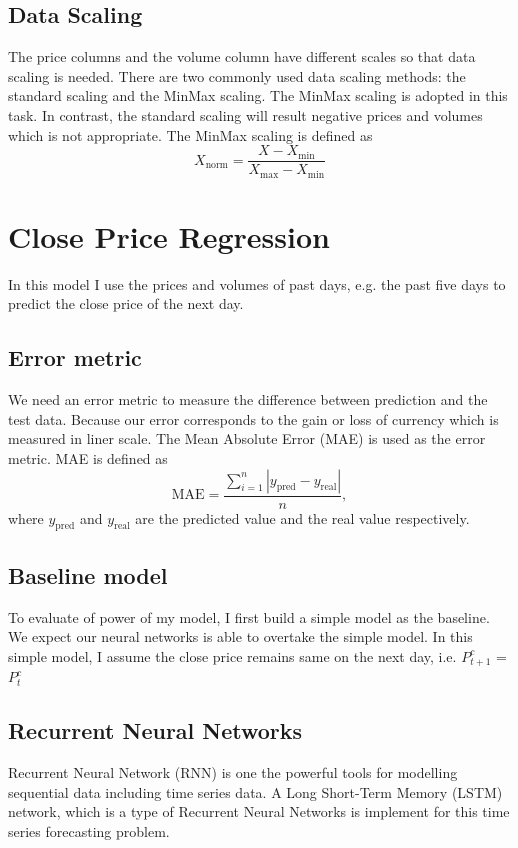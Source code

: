 \documentclass[a4paper, 11pt, usenatbib]{article}
\begin{document}
\subsection{Data Scaling}
The price columns and the volume column have different scales so that data scaling is needed. There are two commonly used data scaling methods: the standard scaling and the MinMax scaling. The MinMax scaling is adopted in this task. In contrast, the standard scaling will result negative prices and volumes which is not appropriate. The MinMax scaling is defined as
\begin{equation}
X_\mathrm{norm} = \frac{X-X_\mathrm{min}}{X_\mathrm{max} - X_\mathrm{min}}
\end{equation}


\section{Close Price Regression}
In this model I use the prices and volumes of past days, e.g. the past five days to predict the close price of the next day.

\subsection{Error metric}
We need an error metric to measure the difference between prediction and the test data. Because our error corresponds to the gain or loss of currency which is measured in liner scale. The Mean Absolute Error (MAE) is used as the error metric. MAE is defined as
\begin{equation}
\mathrm{MAE} = \frac{\sum_{i=1}^n |y_\mathrm{pred} - y_\mathrm{real}|}{n},
\end{equation}
where $y_\mathrm{pred}$ and $y_\mathrm{real}$ are the predicted value and the real value respectively.

\subsection{Baseline model}
To evaluate of power of my model, I first build a simple model as the baseline. We expect our neural networks is able to overtake the simple model. In this simple model, I assume the close price remains same on the next day, i.e. $P_{t+1}^c$ = $P_{t}^c$

\subsection{Recurrent Neural Networks}
Recurrent Neural Network (RNN) is one the powerful tools for modelling sequential data including time series data. A Long Short-Term Memory (LSTM) network, which is a type of Recurrent Neural Networks is implement for this time series forecasting problem.
\end{document}
